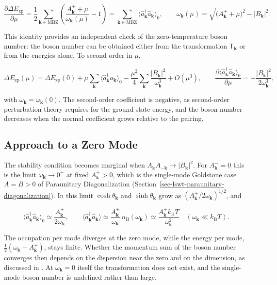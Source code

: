 \[
\frac{\partial\Delta E_{\mathrm{zp}}}{\partial\mu}
=\frac12\sum_{\mathbf k\in\mathrm{MBZ}}\left(\frac{A_{\mathbf k}^{+}+\mu}{\omega_{\mathbf k}(\mu)}-1\right)
=\sum_{\mathbf k\in\mathrm{MBZ}}\langle\hat a_{\mathbf k}^\dagger\hat a_{\mathbf k}\rangle_0,
\qquad
\omega_{\mathbf k}(\mu)=\sqrt{\big(A_{\mathbf k}^{+}+\mu\big)^2-|B_{\mathbf k}|^2}.
\]

This identity provides an independent check of the zero-temperature boson number: the boson number can be obtained either from the transformation \(\mathsf T_{\mathbf k}\) or from the energies alone. To second order in \(\mu\),

\[
\Delta E_{\mathrm{zp}}(\mu)=\Delta E_{\mathrm{zp}}(0)+\mu\sum_{\mathbf k}\langle\hat a_{\mathbf k}^\dagger\hat a_{\mathbf k}\rangle_0-\frac{\mu^2}{4}\sum_{\mathbf k}\frac{|B_{\mathbf k}|^2}{\omega_{\mathbf k}^3}+O(\mu^3),
\qquad
\frac{\partial\langle\hat a_{\mathbf k}^\dagger\hat a_{\mathbf k}\rangle_0}{\partial\mu}=-\frac{|B_{\mathbf k}|^2}{2\omega_{\mathbf k}^3},
\]

with \(\omega_{\mathbf k}=\omega_{\mathbf k}(0)\). The second-order coefficient is negative, as second-order perturbation theory requires for the ground-state energy, and the boson number decreases when the normal coefficient grows relative to the pairing.

\subsection{Approach to a Zero Mode}

The stability condition becomes marginal when \(A_{\mathbf k}A_{-\mathbf k}\to|B_{\mathbf k}|^2\). For \(A_{\mathbf k}^{-}=0\) this is the limit \(\omega_{\mathbf k}\to0^+\) at fixed \(A_{\mathbf k}^{+}>0\), which is the single-mode Goldstone case \(A=B>0\) of Paraunitary Diagonalization (Section~\ref{sec-lswt-paraunitary-diagonalization}). In this limit \(\cosh\theta_{\mathbf k}\) and \(\sinh\theta_{\mathbf k}\) grow as \((A_{\mathbf k}^{+}/2\omega_{\mathbf k})^{1/2}\), and

\[
\langle\hat a_{\mathbf k}^\dagger\hat a_{\mathbf k}\rangle_0\simeq\frac{A_{\mathbf k}^{+}}{2\omega_{\mathbf k}},
\qquad
\langle\hat a_{\mathbf k}^\dagger\hat a_{\mathbf k}\rangle\simeq\frac{A_{\mathbf k}^{+}}{\omega_{\mathbf k}}\,n_{\mathrm B}(\omega_{\mathbf k})\simeq\frac{A_{\mathbf k}^{+}k_{\mathrm B}T}{\omega_{\mathbf k}^2}
\quad(\omega_{\mathbf k}\ll k_{\mathrm B}T).
\]

The occupation per mode diverges at the zero mode, while the energy per mode, \(\frac12(\omega_{\mathbf k}-A_{\mathbf k}^{+})\), stays finite. Whether the momentum sum of the boson number converges then depends on the dispersion near the zero and on the dimension, as discussed in . At \(\omega_{\mathbf k}=0\) itself the transformation does not exist, and the single-mode boson number is undefined rather than large.

